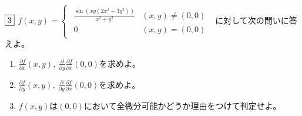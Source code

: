 \documentclass[dvipdfmx]{jsreport}
\newcounter{num}[section]
\begin{document}
\begin{tcolorbox} %
	$\fbox{3}$ 
$f(x, y)= 
\begin{cases}
\begin{matrix}
	\frac{\sin{(xy(2x^2- 3y^2))}}{x^2+ y^2}& (x, y)\ne (0, 0)\\
	0& (x, y)= (0, 0)
\end{matrix}
\end{cases}
$
	に対して次の問いに答えよ。
\begin{enumerate}
	\item $\frac{\partial f}{\partial x}(x, y),\ \frac{\partial}{\partial y}\frac{\partial f}{\partial x}(0, 0)$を求めよ。
	\item $\frac{\partial f}{\partial y}(x, y),\ \frac{\partial}{\partial y}\frac{\partial f}{\partial x}(0, 0)$を求めよ。
	\item $f(x, y)$は$(0, 0)$において全微分可能かどうか理由をつけて判定せよ。
\end{enumerate}
\end{tcolorbox}
\end{document}

